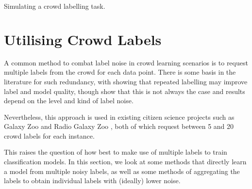         \begin{algorithm}[H]

            \caption{Simulating a crowd labelling task.}
            \label{alg:simulated-crowd}
        \end{algorithm}

\section{Utilising Crowd Labels}
\label{sec:crowd-labels}


    A common method to combat label noise in crowd learning scenarios is to
    request multiple labels from the crowd for each data point.  There is some
    basis in the literature for such redundancy, with \citet{sheng08} showing
    that repeated labelling may improve label and model quality, though
    \citet{lin14} show that this is not always the case and results depend on
    the level and kind of label noise.

    Nevertheless, this approach is used in existing citizen science projects
    such as Galaxy Zoo \citep{lintott08} and Radio Galaxy Zoo
    \citep{banfield15}, both of which request between 5 and 20 crowd labels for
    each instance.

    This raises the question of how best to make use of multiple labels to train
    classification models. In this section, we look at some methods that
    directly learn a model from multiple noisy labels, as well as some methods
    of aggregating the labels to obtain individual labels with (ideally) lower
    noise.


